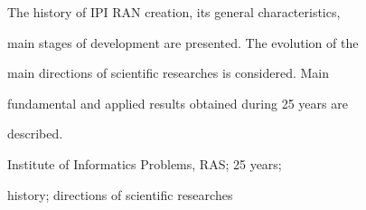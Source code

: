 The history of IPI RAN creation, its general characteristics,

main stages of development are presented. The evolution of the

main directions of scientific researches is considered. Main

fundamental and applied results obtained during 25 years are

described.



Institute of Informatics Problems, RAS; 25 years;

history; directions of scientific researches



